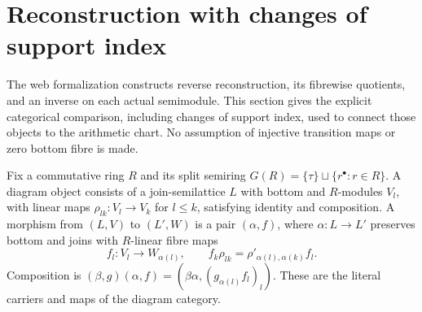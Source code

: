 \section{Reconstruction with changes of support index}
\label{sec:diagram-equivalence}
The web formalization constructs reverse reconstruction, its fibrewise
quotients, and an inverse on each actual semimodule. This section gives
the explicit categorical comparison, including changes of support
index, used to connect those objects to the arithmetic chart.
No assumption of injective transition maps or zero bottom fibre is made.

Fix a commutative ring \(R\) and its split semiring
\(G(R)=\{\tau\}\sqcup\{r^\bullet:r\in R\}\).
A diagram object consists of a join-semilattice \(L\) with bottom
and \(R\)-modules \(V_l\), with linear maps
\(\rho_{lk}:V_l\to V_k\) for \(l\leq k\), satisfying identity and
composition. A morphism from \((L,V)\) to \((L',W)\) is a pair
\((\alpha,f)\), where \(\alpha:L\to L'\) preserves bottom and joins
with \(R\)-linear fibre maps
\[
 f_l:V_l\to W_{\alpha(l)},\qquad
 f_k\rho_{lk}=\rho'_{\alpha(l),\alpha(k)}f_l .
 \tag{D1}
\]
Composition is
\((\beta,g)(\alpha,f)=(\beta\alpha,(g_{\alpha(l)}f_l)_l)\).
These are the literal carriers and maps of the diagram category.

